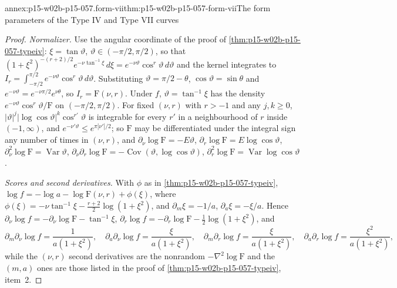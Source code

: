 \begin{annexitem}{annex:p15-w02b-p15-057.form-vii}{thm:p15-w02b-p15-057-form-vii}{The form parameters of the Type IV and Type VII curves}
\begin{proof}
\emph{Normalizer.} Use the angular coordinate of the proof of
\cref{thm:p15-w02b-p15-057-typeiv}: \(\xi=\tan\vartheta\),
\(\vartheta\in(-\pi/2,\pi/2)\), so that
\((1+\xi^2)^{-(r+2)/2}e^{-\nu\tan^{-1}\xi}\,d\xi
=e^{-\nu\vartheta}\cos^r\vartheta\,d\vartheta\) and the kernel integrates
to \(I_r=\int_{-\pi/2}^{\pi/2}e^{-\nu\vartheta}\cos^r\vartheta\,d\vartheta\).
Substituting \(\vartheta=\pi/2-\theta\), \(\cos\vartheta=\sin\theta\) and
\(e^{-\nu\vartheta}=e^{-\nu\pi/2}e^{\nu\theta}\), so
\(I_r=\mathrm F(\nu,r)\). Under \(f\), \(\vartheta=\tan^{-1}\xi\) has the
density \(e^{-\nu\vartheta}\cos^r\vartheta/\mathrm F\) on
\((-\pi/2,\pi/2)\). For fixed \((\nu,r)\) with \(r>-1\) and any
\(j,k\geq0\), \(|\vartheta|^j|\log\cos\vartheta|^k\cos^{r'}\vartheta\) is
integrable for every \(r'\) in a neighbourhood of \(r\) inside
\((-1,\infty)\), and \(e^{-\nu'\vartheta}\leq e^{\pi|\nu'|/2}\); so
\(\mathrm F\) may be differentiated under the integral sign any number of
times in \((\nu,r)\), and
\(\partial_\nu\log\mathrm F=-E\vartheta\),
\(\partial_r\log\mathrm F=E\log\cos\vartheta\),
\(\partial_\nu^2\log\mathrm F=\operatorname{Var}\vartheta\),
\(\partial_\nu\partial_r\log\mathrm F=-\operatorname{Cov}(\vartheta,\log
\cos\vartheta)\), \(\partial_r^2\log\mathrm F=\operatorname{Var}\log\cos
\vartheta\).

\emph{Scores and second derivatives.} With \(\phi\) as in
\cref{thm:p15-w02b-p15-057-typeiv},
\(\log f=-\log a-\log\mathrm F(\nu,r)+\phi(\xi)\), where
\(\phi(\xi)=-\nu\tan^{-1}\xi-\frac{r+2}2\log(1+\xi^2)\), and
\(\partial_m\xi=-1/a\), \(\partial_a\xi=-\xi/a\). Hence
\(\partial_\nu\log f=-\partial_\nu\log\mathrm F-\tan^{-1}\xi\),
\(\partial_r\log f=-\partial_r\log\mathrm F-\frac12\log(1+\xi^2)\), and
\[
 \partial_m\partial_\nu\log f=\frac{1}{a(1+\xi^2)},\quad
 \partial_a\partial_\nu\log f=\frac{\xi}{a(1+\xi^2)},\quad
 \partial_m\partial_r\log f=\frac{\xi}{a(1+\xi^2)},\quad
 \partial_a\partial_r\log f=\frac{\xi^2}{a(1+\xi^2)},
\]
while the \((\nu,r)\) second derivatives are the nonrandom
\(-\nabla^2\log\mathrm F\) and the \((m,a)\) ones are those listed in the
proof of \cref{thm:p15-w02b-p15-057-typeiv}, item~2.


\end{proof}
\end{annexitem}
